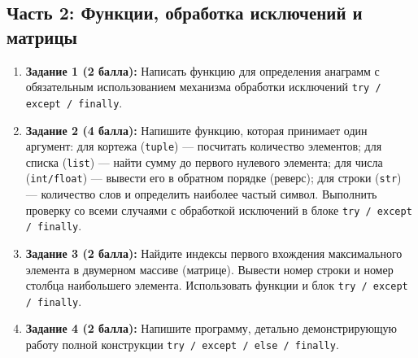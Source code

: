 \documentclass[14pt,a4paper]{extarticle}
\begin{document}
\subsection{Часть 2: Функции, обработка исключений и матрицы}
\begin{enumerate}
    \item \textbf{Задание 1 (2 балла):} Написать функцию для определения анаграмм с обязательным использованием механизма обработки исключений \texttt{try / except / finally}.
    \item \textbf{Задание 2 (4 балла):} Напишите функцию, которая принимает один аргумент: для кортежа (\texttt{tuple}) --- посчитать количество элементов; для списка (\texttt{list}) --- найти сумму до первого нулевого элемента; для числа (\texttt{int/float}) --- вывести его в обратном порядке (реверс); для строки (\texttt{str}) --- количество слов и определить наиболее частый символ. Выполнить проверку со всеми случаями с обработкой исключений в блоке \texttt{try / except / finally}.
    \item \textbf{Задание 3 (2 балла):} Найдите индексы первого вхождения максимального элемента в двумерном массиве (матрице). Вывести номер строки и номер столбца наибольшего элемента. Использовать функции и блок \texttt{try / except / finally}.
    \item \textbf{Задание 4 (2 балла):} Напишите программу, детально демонстрирующую работу полной конструкции \texttt{try / except / else / finally}.
\end{enumerate}
\end{document}
